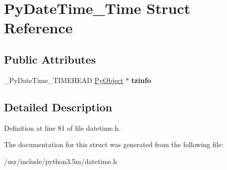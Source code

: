 \hypertarget{structPyDateTime__Time}{}\section{Py\+Date\+Time\+\_\+\+Time Struct Reference}
\label{structPyDateTime__Time}
\subsection*{Public Attributes}
\begin{DoxyCompactItemize}
\item 
\+\_\+\+Py\+Date\+Time\+\_\+\+T\+I\+M\+E\+H\+E\+AD \hyperlink{struct__object}{Py\+Object} $\ast$ {\bfseries tzinfo}\hypertarget{structPyDateTime__Time_ac61bbd01aee42135152e93a5212bb689}{}\label{structPyDateTime__Time_ac61bbd01aee42135152e93a5212bb689}

\end{DoxyCompactItemize}


\subsection{Detailed Description}


Definition at line 81 of file datetime.\+h.



The documentation for this struct was generated from the following file\+:\begin{DoxyCompactItemize}
\item 
/usr/include/python3.\+5m/datetime.\+h\end{DoxyCompactItemize}
